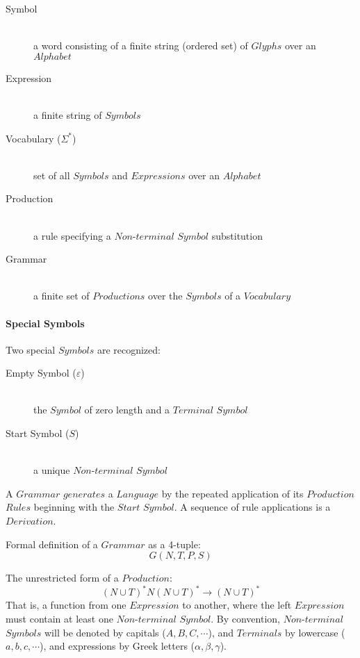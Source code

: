 \documentclass{article}
\begin{document}
    \begin{description}

    \item[Symbol] \hfill \\
    a word consisting of a finite string (ordered set) of $Glyphs$
    over an $Alphabet$

    \item[Expression] \hfill \\
    a finite string of $Symbols$

    \item[Vocabulary ($\Sigma^{*}$)] \hfill \\
    set of all $Symbols$ and $Expressions$ over an $Alphabet$

    \item[Production] \hfill \\
    a rule specifying a $Non$-$terminal$ $Symbol$ substitution

    \item[Grammar] \hfill \\
    a finite set of $Productions$ over the $Symbols$ of a $Vocabulary$

    \end{description}

\paragraph{Special Symbols}

Two special $Symbols$ are recognized:

    \begin{description}

    \item[Empty Symbol ($\varepsilon$)] \hfill \\
    the $Symbol$ of zero length and a $Terminal$ $Symbol$

    \item[Start Symbol ($S$)] \hfill \\
    a unique $Non$-$terminal$ $Symbol$

    \end{description}

A $Grammar$ $generates$ a $Language$ by the repeated application
of its $Production$ $Rules$ beginning with the $Start$ $Symbol$. A
sequence of rule applications is a $Derivation$.

Formal definition of a $Grammar$ as a 4-tuple:
\[
    G(N,T,P,S)
\]

The unrestricted form of a $Production$:
\[
    (N \cup T)^*N(N \cup T)^* \rightarrow (N \cup T)^*
\]
That is, a function from one $Expression$ to another, where the left
$Expression$ must contain at least one $Non$-$terminal$ $Symbol$. By
convention, $Non$-$terminal$ $Symbols$ will be denoted by capitals
($A,B,C,\cdots$), and $Terminals$ by lowercase ($a,b,c,\cdots$), and
expressions by Greek letters ($\alpha,\beta,\gamma$).
\end{document}
